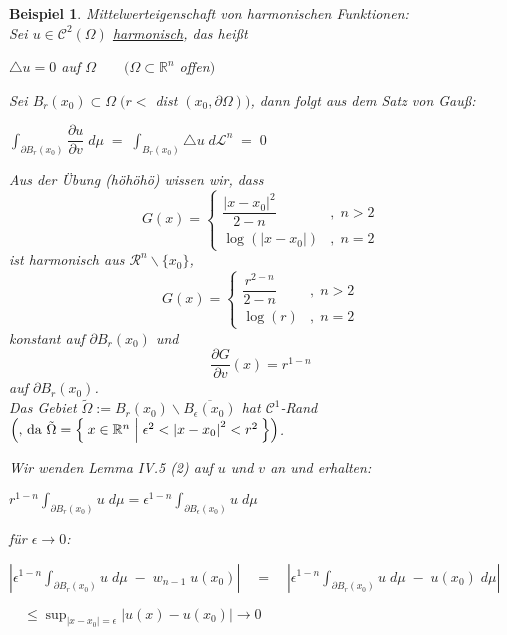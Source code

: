 \documentclass[11pt]{memoir}
\theoremstyle{changebreak}
\newtheorem{Beispiel}{Beispiel}[chapter]
\newcommand{\dom}{\partial\Omega}
\newcommand{\dudv}{\dfrac{\partial u}{\partial v}}
\begin{document}
\begin{Beispiel}
\emph{Mittelwerteigenschaft von harmonischen Funktionen}: \\
Sei $u \in \mathscr C^2(\Omega)$ \underline{harmonisch}, das heißt
\begin{center}
	$\triangle u = 0$ \quad auf $\Omega \qquad (\Omega \subset \mathbb R^n$ offen$)$
\end{center}
Sei $B_r(x_0) \subset \Omega \;(r < $ dist $(x_0, \dom))$, dann folgt aus dem Satz von Gauß:
\begin{center}
	$\int_{\partial B_r(x_0)} \dudv \; d\mu \; = \; \int_{B_r(x_0)} \triangle u \; d\mathscr L^n \; = \; 0$
\end{center}
Aus der Übung (höhöhö) wissen wir, dass
\begin{equation}
	G(x) =
	\begin{cases}
		\dfrac{\left | x - x_0 \right | ^2 }{2-n} & , \; n > 2 \\
		\log(\left | x - x_0 \right |) & ,\; n = 2
	\end{cases}
\end{equation}
ist harmonisch aus $\mathscr R^n\backslash \{x_0\}$,
\begin{equation}
	G(x) =
	\begin{cases}
		\dfrac{r^{2-n} }{2-n} & , \; n > 2 \\
		\log(r) & ,\; n = 2
	\end{cases}
\end{equation}
konstant auf $\partial B_r(x_0)$ und 
\begin{equation}
	\dfrac{\partial G}{\partial v} (x) = r^{1-n}
\end{equation}
auf $\partial B_r(x_0)$.\\
Das Gebiet $\tilde\Omega := B_r(x_0) \backslash \overline{B_\epsilon (x_0)}$ hat $\mathscr C^1$-Rand $\left(\text{, da }\tilde\Omega = \Set{x \in \mathbb R^n| \epsilon^2 < \left |x-x_0\right |^2 < r^2}\right)$. 
\par\bigskip
Wir wenden Lemma IV.5 (2) auf $u$ und $v$ an und erhalten:
\par\bigskip
$r^{1-n} \int_{\partial B_r(x_0)} u \; d\mu = \epsilon^{1-n} \int_{\partial B_\epsilon (x_0)} u \; d\mu$
\par\bigskip
für $\epsilon \rightarrow 0$:
\par\bigskip
$\left | \epsilon^{1-n}  \int_{\partial B_r(x_0)} u \; d\mu \; - \; w_{n-1} \;u(x_0)\right | 
\quad = \quad 
\left | \epsilon^{1-n}  \int_{\partial B_r(x_0)} u \; d\mu \; -  \;u(x_0)\; d\mu \right | $
\par\bigskip
$\quad \leq \sup_{|x-x_0| = \epsilon} \left |u(x) - u(x_0)\right | \longrightarrow 0$


\end{Beispiel}
\end{document}
